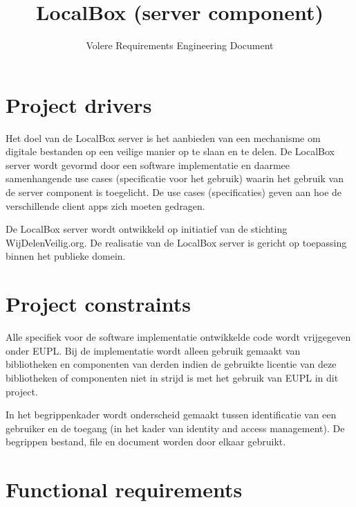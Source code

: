 \documentclass[[11pt,a4paper]{article}
\title{LocalBox (server component) }
\author{Volere Requirements Engineering Document}
\newcommand\requirement[2]{\subsection{#2}\label{#1}}
\newcommand\explanation{\noindent\textbf{Explanation: }}
\newcommand\reason{\noindent\textbf{Reason: }}
\newcommand\criterion{\noindent\textbf{Fit criterion: }}
\begin{document}
\titlepage \maketitle

\section{Project drivers}

Het doel van de LocalBox server is het aanbieden van een mechanisme om digitale bestanden op een veilige manier op te slaan en te delen. De LocalBox server wordt gevormd door een software implementatie en daarmee samenhangende use cases (specificatie voor het gebruik) waarin het gebruik van de server component is toegelicht. De use cases (specificaties) geven aan hoe de verschillende client apps zich moeten gedragen.

De LocalBox server wordt ontwikkeld op initiatief van de stichting WijDelenVeilig.org. De realisatie van de LocalBox server is gericht op toepassing binnen het publieke domein.

\section{Project constraints} 

Alle specifiek voor de software implementatie ontwikkelde code wordt vrijgegeven onder EUPL. Bij de implementatie wordt alleen gebruik gemaakt van bibliotheken en componenten van derden indien de gebruikte licentie van deze bibliotheken of componenten niet in strijd is met het gebruik van EUPL in dit project.

In het begrippenkader wordt onderscheid gemaakt tussen identificatie van een gebruiker en de toegang (in het kader van identity and access management). De begrippen bestand, file en document worden door elkaar gebruikt.

\section{Functional requirements}





\end{document}
